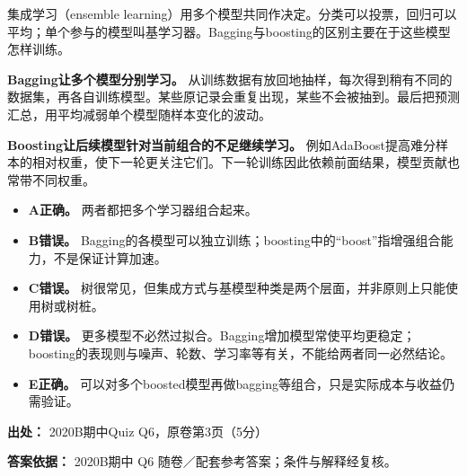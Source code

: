 集成学习（ensemble learning）用多个模型共同作决定。分类可以投票，回归可以平均；单个参与的模型叫基学习器。Bagging与boosting的区别主要在于这些模型怎样训练。


\textbf{Bagging让多个模型分别学习。} 从训练数据有放回地抽样，每次得到稍有不同的数据集，再各自训练模型。某些原记录会重复出现，某些不会被抽到。最后把预测汇总，用平均减弱单个模型随样本变化的波动。


\textbf{Boosting让后续模型针对当前组合的不足继续学习。} 例如AdaBoost提高难分样本的相对权重，使下一轮更关注它们。下一轮训练因此依赖前面结果，模型贡献也常带不同权重。



\begin{itemize}

\item \textbf{A正确。} 两者都把多个学习器组合起来。

\item \textbf{B错误。} Bagging的各模型可以独立训练；boosting中的“boost”指增强组合能力，不是保证计算加速。

\item \textbf{C错误。} 树很常见，但集成方式与基模型种类是两个层面，并非原则上只能使用树或树桩。

\item \textbf{D错误。} 更多模型不必然过拟合。Bagging增加模型常使平均更稳定；boosting的表现则与噪声、轮数、学习率等有关，不能给两者同一必然结论。

\item \textbf{E正确。} 可以对多个boosted模型再做bagging等组合，只是实际成本与收益仍需验证。

\end{itemize}


\textbf{出处：} 2020B期中Quiz Q6，原卷第3页（5分）


\textbf{答案依据：} 2020B期中 Q6 随卷／配套参考答案；条件与解释经复核。
